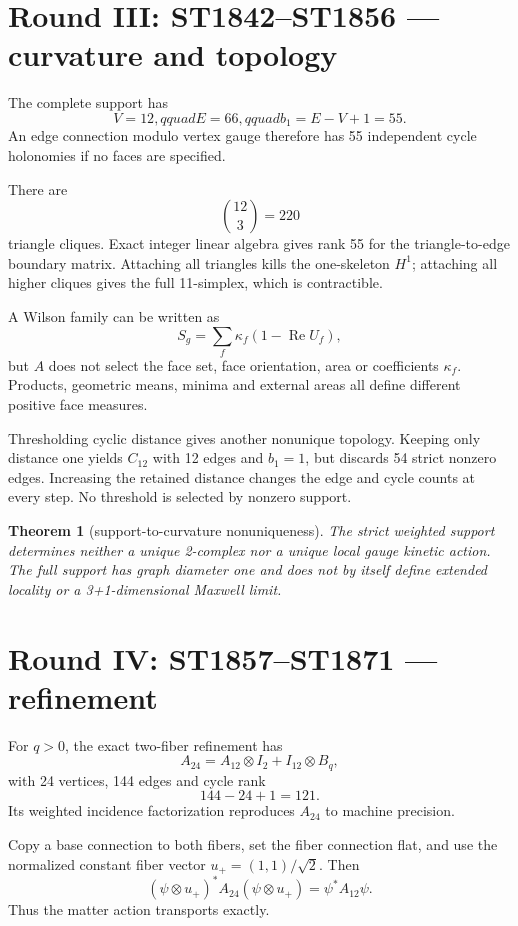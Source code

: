 \documentclass[11pt,a4paper]{article}
\newtheorem{theorem}{Theorem}\newcommand{\status}[1]{\textsf{[#1]}}
\begin{document}
\section{Round III: ST1842--ST1856 --- curvature and topology}

The complete support has
\[
V=12,qquad E=66,qquad b_1=E-V+1=55.
\]
An edge connection modulo vertex gauge therefore has 55 independent cycle
holonomies if no faces are specified.

There are
\[
\binom{12}{3}=220
\]
triangle cliques.  Exact integer linear algebra gives rank 55 for the
triangle-to-edge boundary matrix.  Attaching all triangles kills the
one-skeleton $H^1$; attaching all higher cliques gives the full 11-simplex,
which is contractible.

A Wilson family can be written as
\[
S_g=\sum_f\kappa_f(1-\operatorname{Re}U_f),
\]
but $A$ does not select the face set, face orientation, area or coefficients
$\kappa_f$.  Products, geometric means, minima and external areas all define
different positive face measures.

Thresholding cyclic distance gives another nonunique topology.  Keeping only
distance one yields $C_{12}$ with 12 edges and $b_1=1$, but discards 54
strict nonzero edges.  Increasing the retained distance changes the edge and
cycle counts at every step.  No threshold is selected by nonzero support.

\begin{theorem}[support-to-curvature nonuniqueness]
The strict weighted support determines neither a unique 2-complex nor a unique
local gauge kinetic action.  The full support has graph diameter one and does
not by itself define extended locality or a 3+1-dimensional Maxwell limit.
\end{theorem}

\section{Round IV: ST1857--ST1871 --- refinement}

For $q>0$, the exact two-fiber refinement has
\[
A_{24}=A_{12}\otimes I_2+I_{12}\otimes B_q,
\]
with 24 vertices, 144 edges and cycle rank
\[
144-24+1=121.
\]
Its weighted incidence factorization reproduces $A_{24}$ to machine precision.

Copy a base connection to both fibers, set the fiber connection flat, and use
the normalized constant fiber vector $u_+=(1,1)/\sqrt2$.  Then
\[
(\psi\otimes u_+)^*A_{24}(\psi\otimes u_+)=\psi^*A_{12}\psi.
\]
Thus the matter action transports exactly.
\end{document}
